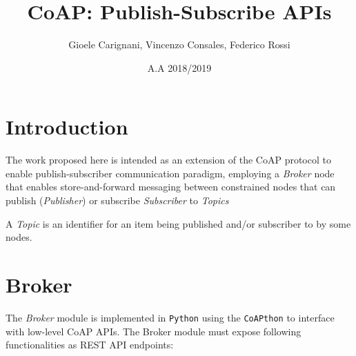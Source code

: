 \documentclass[a4paper]{article}
\title{CoAP: Publish-Subscribe APIs}
\author{Gioele Carignani, Vincenzo Consales, Federico Rossi}
\date{A.A 2018/2019}
\begin{document}
\maketitle
\section{Introduction}
The work proposed here is intended as an extension of the CoAP protocol to enable publish-subscriber communication paradigm, employing a \textit{Broker} node that enables store-and-forward messaging between constrained nodes that can publish (\textit{Publisher}) or subscribe \textit{Subscriber} to \textit{Topics}

A \textit{Topic} is an identifier for an item being published and/or subscriber to by some nodes. 
\section{Broker}
The \textit{Broker} module is implemented in \texttt{Python} using the \texttt{CoAPthon} to interface with low-level CoAP APIs. The Broker module must expose following functionalities as REST API endpoints: 
\end{document}
